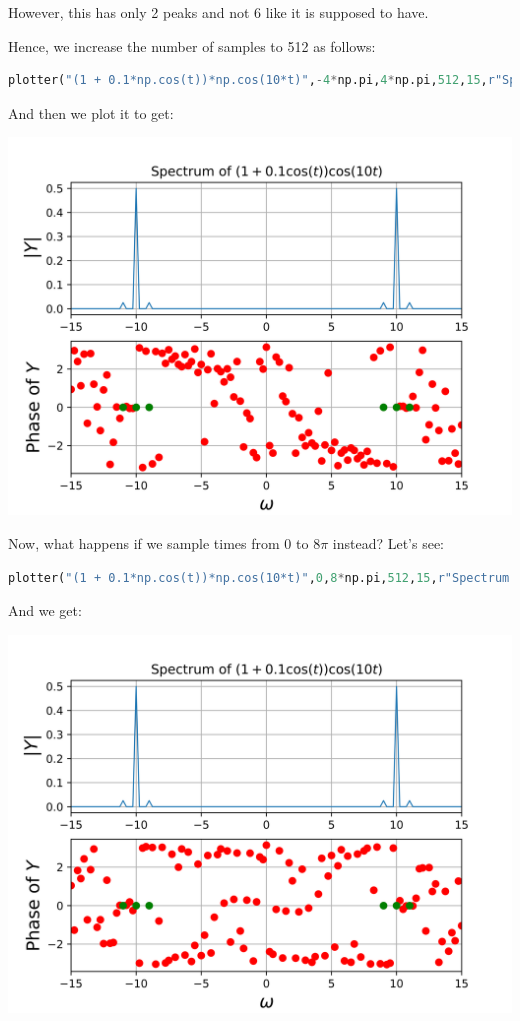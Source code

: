 \documentclass[12pt]{article}
\begin{document}
However, this has only 2 peaks and not 6 like it is supposed to have.

Hence, we increase the number of samples to 512 as follows:
\begin{lstlisting}[language=Python]
plotter("(1 + 0.1*np.cos(t))*np.cos(10*t)",-4*np.pi,4*np.pi,512,15,r"Spectrum of $\left(1+0.1\cos\left(t\right)\right)\cos\left(10t\right)$",save=True,fignum=2)
\end{lstlisting}

And then we plot it to get:
\begin{center}
    \includegraphics[scale=0.7]{images/fig3.png}
\end{center}

Now, what happens if we sample times from 0 to $8\pi$ instead?
Let's see:

\begin{lstlisting}[language=Python]
plotter("(1 + 0.1*np.cos(t))*np.cos(10*t)",0,8*np.pi,512,15,r"Spectrum of $\left(1+0.1\cos\left(t\right)\right)\cos\left(10t\right)$",save=True,fignum=2)
\end{lstlisting}

And we get:
\begin{center}
    \includegraphics[scale=0.7]{images/fig4.png}
\end{center}
\end{document}
